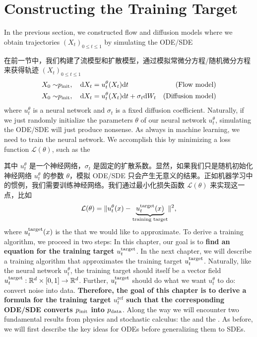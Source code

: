 \section{Constructing the Training Target}

\label{sec:fokker_planck}

In the previous section, we constructed flow and diffusion models where we obtain trajectories $(X_t)_{0\leq t\leq 1}$ by simulating the ODE/SDE

在前一节中，我们构建了流模型和扩散模型，通过模拟常微分方程/随机微分方程来获得轨迹 $(X_t)_{0\leq t\leq 1}$
\begin{align}
\label{e:sde_generative_model_restated_section_3}
 X_0\sim&p_{\rm{init}},\quad \mathrm{d} X_t = u_t^\theta(X_t)\mathrm{d} t& \text{(Flow model)}\\
 X_0\sim&p_{\rm{init}},\quad \mathrm{d} X_t = u_t^\theta(X_t)\mathrm{d} t + \sigma_t\mathrm{d} W_t& \text{(Diffusion model)}
\end{align}
where $u_t^\theta$ is a neural network and $\sigma_t$ is a fixed diffusion coefficient. Naturally, if we just randomly initialize the parameters $\theta$ of our neural network $u_t^\theta$, simulating the ODE/SDE will just produce nonsense. As always in machine learning, we need to train the neural network. We accomplish this by minimizing a loss function $\mathcal{L}(\theta)$, such as the 

其中 $u_t^\theta$ 是一个神经网络，$\sigma_t$ 是固定的扩散系数。显然，如果我们只是随机初始化神经网络 $u_t^\theta$ 的参数 $\theta$，模拟 ODE/SDE 只会产生无意义的结果。正如机器学习中的惯例，我们需要训练神经网络。我们通过最小化损失函数 $\mathcal{L}(\theta)$ 来实现这一点，比如 
\begin{align*}
    \mathcal{L}(\theta) = \lVert u_t^\theta(x)-\underbrace{u^{\text{target}}_t(x)}_{\text{training target}}\rVert^2 ,
\end{align*}
where $u^{\text{target}}_t(x)$ is the  that we would like to approximate. To derive a training algorithm, we proceed in two steps: In this chapter, our goal is to \textbf{find an equation for the training target $u^{\text{target}}_t$}. In the next chapter, we will describe a training algorithm that approximates the training target $u^{\text{target}}_t$. Naturally, like the neural network $u_t^\theta$, the training target should itself be a vector field $u^{\text{target}}_t:\mathbb{R}^d\times[0,1]\to\mathbb{R}^d$. Further, $u^{\text{target}}_t$ should do what we want $u_t^\theta$ to do: convert noise into data. \textbf{Therefore, the goal of this chapter is to derive a formula for the training target $u_t^\text{ref}$ such that the corresponding ODE/SDE converts $p_{\rm{init}}$ into $p_{\rm{data}}$}. Along the way we will encounter two fundamental results from physics and stochastic calculus: the  and the . As before, we will first describe the key ideas for ODEs before generalizing them to SDEs.

